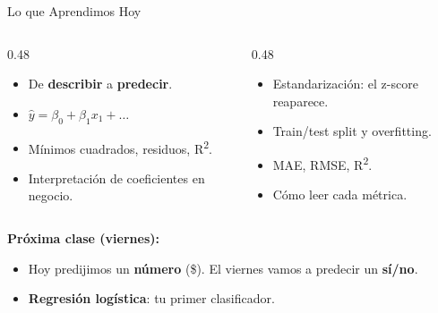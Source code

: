 \documentclass[aspectratio=169, 11pt]{beamer}
\begin{document}
\begin{frame}{Lo que Aprendimos Hoy}
  \vspace{-4pt}
  \begin{columns}[T]
    \begin{column}{0.48\textwidth}
      {\footnotesize
      \begin{itemize}\setlength{\itemsep}{4pt}
        \item[{\color{codeGreen}\faCheckCircle}]
          De \textbf{describir} a \textbf{predecir}.
        \item[{\color{codeGreen}\faCheckCircle}]
          $\hat{y} = \beta_0 + \beta_1 x_1 + \ldots$
        \item[{\color{codeGreen}\faCheckCircle}]
          Mínimos cuadrados, residuos, R\textsuperscript{2}.
        \item[{\color{codeGreen}\faCheckCircle}]
          Interpretación de coeficientes en negocio.
      \end{itemize}
      }
    \end{column}

    \begin{column}{0.48\textwidth}
      {\footnotesize
      \begin{itemize}\setlength{\itemsep}{4pt}
        \item[{\color{codeGreen}\faCheckCircle}]
          Estandarización: el z-score reaparece.
        \item[{\color{codeGreen}\faCheckCircle}]
          Train/test split y overfitting.
        \item[{\color{codeGreen}\faCheckCircle}]
          MAE, RMSE, R\textsuperscript{2}.
        \item[{\color{codeGreen}\faCheckCircle}]
          Cómo leer cada métrica.
      \end{itemize}
      }
    \end{column}
  \end{columns}

  \vspace{6pt}
  {\small\color{arcaDark}\bfseries Próxima clase (viernes):}
  \vspace{2pt}
  {\footnotesize
  \begin{itemize}\setlength{\itemsep}{2pt}
    \item[{\color{arcaRed}\faArrowRight}]
      Hoy predijimos un \textbf{número} (\$). El viernes vamos a predecir
      un \textbf{sí/no}.
    \item[{\color{arcaRed}\faArrowRight}]
      \textbf{Regresión logística}: tu primer clasificador.
  \end{itemize}
  }
\end{frame}
\end{document}
